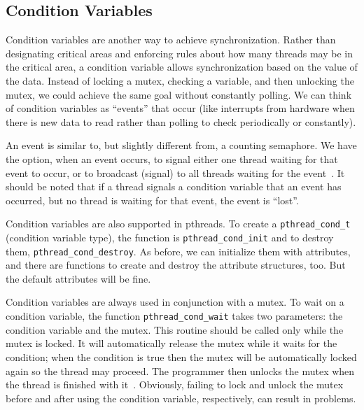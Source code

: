 




\subsection*{Condition Variables}
Condition variables are another way to achieve synchronization. Rather than designating critical areas and enforcing rules about how many threads may be in the critical area, a condition variable allows synchronization based on the value of the data. Instead of locking a mutex, checking a variable, and then unlocking the mutex, we could achieve the same goal without constantly polling. We can think of condition variables as ``events'' that occur (like interrupts from hardware when there is new data to read rather than polling to check periodically or constantly).

An event is similar to, but slightly different from, a counting semaphore. We have the option, when an event occurs, to signal either one thread waiting for that event to occur, or to broadcast (signal) to all threads waiting for the event~\cite{mte241}. It should be noted that if a thread signals a condition variable that an event has occurred, but no thread is waiting for that event, the event is ``lost''. 

Condition variables are also supported in pthreads. To create a \texttt{pthread\_cond\_t} (condition variable type), the function is \texttt{pthread\_cond\_init} and to destroy them, \texttt{pthread\_cond\_destroy}. As before, we can initialize them with attributes, and there are functions to create and destroy the attribute structures, too. But the default attributes will be fine.

Condition variables are always used in conjunction with a mutex. To wait on a condition variable, the function \texttt{pthread\_cond\_wait} takes two parameters: the condition variable and the mutex. This routine should be called only while the mutex is locked. It will automatically release the mutex while it waits for the condition; when the condition is true then the mutex will be automatically locked again so the thread may proceed. The programmer then unlocks the mutex when the thread is finished with it~\cite{pthreads}. Obviously, failing to lock and unlock the mutex before and after using the condition variable, respectively, can result in problems.

